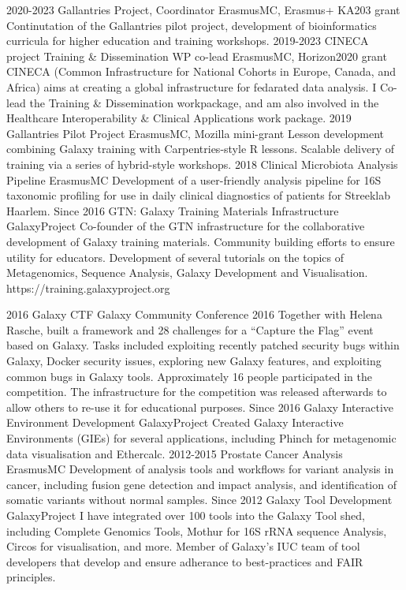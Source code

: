 \documentclass[]{shiltemann-cv}
\begin{document}
\begin{entrylist}
   \entry
    {2020-2023}
    {Gallantries Project, Coordinator}
    {ErasmusMC, Erasmus+ KA203 grant}
    {Continutation of the Gallantries pilot project, development of bioinformatics curricula for higher education and training workshops.}
   \entry
    {2019-2023}
    {CINECA project Training \& Dissemination WP co-lead}
    {ErasmusMC, Horizon2020 grant}
    {CINECA (Common Infrastructure for National Cohorts in Europe, Canada, and Africa) aims at creating a global infrastructure for fedarated data analysis. I Co-lead the Training \& Dissemination  workpackage, and am also involved in the Healthcare Interoperability \& Clinical Applications work package.}
   \entry
    {2019}
    {Gallantries Pilot Project}
    {ErasmusMC, Mozilla mini-grant}
    {Lesson development combining Galaxy training with Carpentries-style R lessons. Scalable delivery of training via a series of hybrid-style workshops.}
  \entry
    {2018}
    {Clinical Microbiota Analysis Pipeline}
    {ErasmusMC}
    {Development of a user-friendly analysis pipeline for 16S taxonomic profiling for use in daily clinical diagnostics of patients for Streeklab Haarlem.}
  \entry
    {Since 2016}
    {GTN: Galaxy Training Materials Infrastructure}
    {GalaxyProject}
    {Co-founder of the GTN infrastructure for the collaborative development of Galaxy training materials. Community building efforts to ensure utility for educators.  Development of several tutorials on the topics of Metagenomics, Sequence Analysis, Galaxy Development and Visualisation. https://training.galaxyproject.org }


  \entry
    {2016}
    {Galaxy CTF}
    {Galaxy Community Conference 2016}
    {Together with Helena Rasche, built a framework and 28 challenges for a “Capture the Flag” event based on Galaxy. Tasks included exploiting recently patched security bugs within Galaxy, Docker security issues, exploring new Galaxy features, and exploiting common bugs in Galaxy tools. Approximately 16 people participated in the competition. The infrastructure for the competition was released afterwards to allow others to re-use it for educational purposes.}
   \entry
     {Since 2016}
     {Galaxy Interactive Environment Development}
     {GalaxyProject}
     {Created Galaxy Interactive Environments (GIEs) for several applications, including Phinch for metagenomic data visualisation and Ethercalc.}
   \entry
     {2012-2015}
     {Prostate Cancer Analysis}
     {ErasmusMC}
     {Development of analysis tools and workflows for variant analysis in cancer, including fusion gene detection and impact analysis, and identification of somatic variants without normal samples.}
   \entry
    {Since 2012}
    {Galaxy Tool Development}
    {GalaxyProject}
    {I have integrated over 100 tools into the Galaxy Tool shed, including Complete Genomics Tools, Mothur for 16S rRNA sequence Analysis, Circos for visualisation, and more. Member of Galaxy's IUC team of tool developers that develop and ensure adherance to best-practices and FAIR principles.}
\end{entrylist}
\newpage
\end{document}
